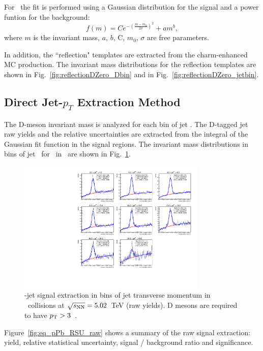 For \Dzero\ the fit is performed using a Gaussian distribution for the signal and a power funtion for the background:
\begin{equation}
\label{e_sigbkgDZero}
f (m) = Ce^{-(\frac{m-m_0}{2\sigma})^2} + am^b,
\end{equation}
where $m$ is the invariant mass, $a$, $b$, C, $m_0$, $\sigma$ are free parameters.

In addition, the ``reflection" templates are extracted from the charm-enhanced MC production. The invariant mass distributions for the reflection templates 
are shown in Fig.~\ref{fig:reflectionDZero_Dbin} and in Fig.~\ref{fig:reflectionDZero_jetbin}.
\subsection{Direct Jet-$p_T$ Extraction Method}
\label{sect:DirectJet}

The D-meson invariant mass is analyzed for each bin of jet \pt. The D-tagged jet raw yields and the relative uncertainties are extracted from the integral of the Gaussian fit function in the signal regions.
The invariant mass distributions in bins of jet \pt\ for \Dstar\ in \pPb\ are shown in Fig.~\ref{fig:eq_pPb_InvMass_Dstar}.

\begin{figure}[H]%
\centering
\includegraphics[width=0.8\textwidth]{pPbplots/plotsEffScale_noEff_pt3_noDetails/invMass_FASTwoSDD}
\caption{\Dstar-jet signal extraction in bins of jet transverse momentum in \pPb\ collisions at $\sqrt{s_{\rm NN}}=5.02$~TeV (raw yields). D mesons are required to have $p_{\rm T}>3$~\GeVc.}
\label{fig:eq_pPb_InvMass_Dstar}
\end{figure}

Figure~\ref{fig:eq_pPb_RSU_raw} shows a summary of the raw signal extraction: yield, relative statistical uncertainty, signal / background ratio and significance.

